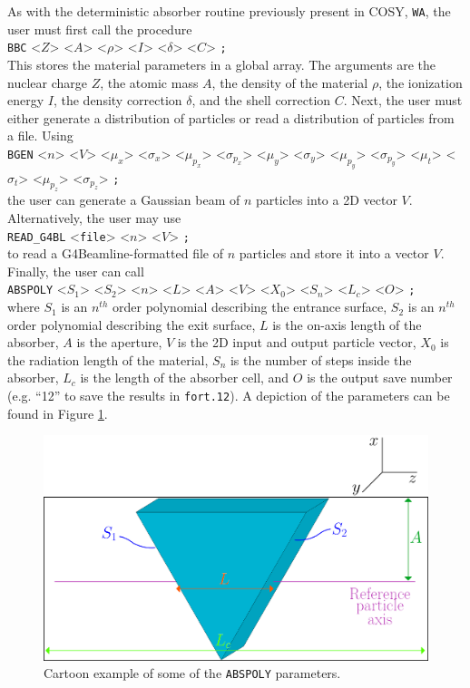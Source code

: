 \label{ssc:user_input}
As with the deterministic absorber routine previously present in COSY, \texttt{WA}, the user must first call the procedure\\
\texttt{BBC} <$Z$> <$A$> <$\rho$> <$I$> <$\delta$> <$C$> \texttt{;} \\
This stores the material parameters in a global array. The arguments are the nuclear charge $Z$, the atomic mass $A$, the density of the material $\rho$, the ionization energy $I$, the density correction $\delta$, and the shell correction $C$. Next, the user must either generate a distribution of particles or read a distribution of particles from a file. Using \\
\texttt{BGEN} <$n$> <$V$> <$\mu_x$> <$\sigma_x$> <$\mu_{p_x}$> <$\sigma_{p_x}$> <$\mu_y$> <$\sigma_y$> <$\mu_{p_y}$> <$\sigma_{p_y}$> <$\mu_t$> <$\sigma_t$> <$\mu_{p_z}$> <$\sigma_{p_z}$> \texttt{;}\\
the user can generate a Gaussian beam of $n$ particles into a 2D vector $V$. Alternatively, the user may use \\
\verb|READ_G4BL| <\texttt{file}> <$n$> <$V$> \texttt{;}\\
to read a G4Beamline-formatted file of $n$ particles and store it into a vector $V$. Finally, the user can call\\
\texttt{ABSPOLY} <$S_1$> <$S_2$> <$n$> <$L$> <$A$> <$V$> <$X_0$> <$S_n$> <$L_c$> <$O$> \texttt{;}\\
where $S_1$ is an $n^{th}$ order polynomial describing the entrance surface, $S_2$ is an $n^{th}$ order polynomial describing the exit surface, $L$ is the on-axis length of the absorber, $A$ is the aperture, $V$ is the 2D input and output particle vector, $X_0$ is the radiation length of the material, $S_n$ is the number of steps inside the absorber, $L_c$ is the length of the absorber cell, and $O$ is the output save number (e.g. ``12'' to save the results in \texttt{fort.12}). A depiction of the parameters can be found in Figure \ref{fig:abspoly}.

\begin{figure}[!htb]
  \centering
    \includegraphics[width=\textwidth]{Figures/abspoly} 
  \caption{Cartoon example of some of the \texttt{ABSPOLY} parameters.}
  \label{fig:abspoly}
\end{figure}

